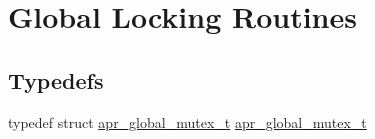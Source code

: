 \hypertarget{group___a_p_r___global_mutex}{\section{Global Locking Routines}
\label{group___a_p_r___global_mutex}
}
\subsection*{Typedefs}
\begin{DoxyCompactItemize}
\item 
typedef struct \hyperlink{group___a_p_r___global_mutex_ga3fc7dc5b076533ee566aa4888ac35ee7}{apr\-\_\-global\-\_\-mutex\-\_\-t} \hyperlink{group___a_p_r___global_mutex_ga3fc7dc5b076533ee566aa4888ac35ee7}{apr\-\_\-global\-\_\-mutex\-\_\-t}
\end{DoxyCompactItemize}
